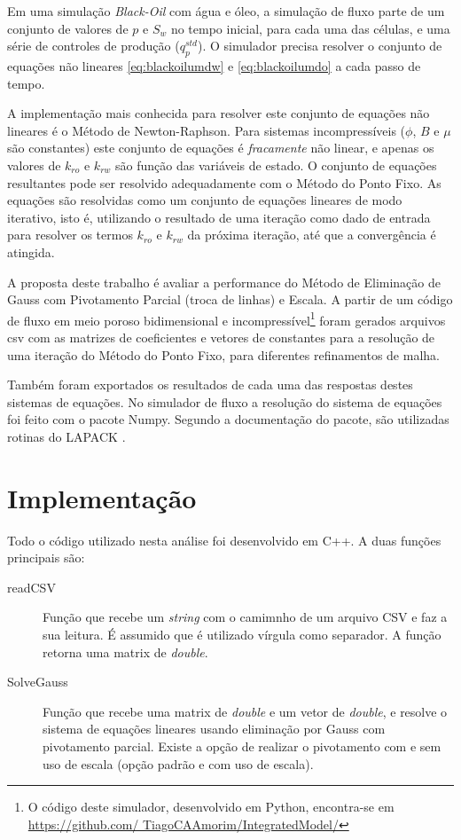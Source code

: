 \documentclass[final,5p]{elsarticle}
\numberwithin{equation}{section}
\begin{document}
            Em uma simulação \emph{Black-Oil} com água e óleo, a simulação de fluxo parte de um conjunto de valores de $p$ e $S_w$ no tempo inicial, para cada uma das células, e uma série de controles de produção ($q^{std}_p$). O simulador precisa resolver o conjunto de equações não lineares \ref{eq:blackoilumdw} e \ref{eq:blackoilumdo} a cada passo de tempo.

            A implementação mais conhecida para resolver este conjunto de equações não lineares é o Método de Newton-Raphson. Para sistemas incompressíveis ($\phi$, $B$ e $\mu$ são constantes) este conjunto de equações é \emph{fracamente} não linear, e apenas os valores de $k_{ro}$ e $k_{rw}$ são função das variáveis de estado. O conjunto de equações resultantes pode ser resolvido adequadamente com o Método do Ponto Fixo. As equações são resolvidas como um conjunto de equações lineares de modo iterativo, isto é, utilizando o resultado de uma iteração como dado de entrada para resolver os termos $k_{ro}$ e $k_{rw}$ da próxima iteração, até que a convergência é atingida.

            A proposta deste trabalho é avaliar a performance do Método de Eliminação de Gauss com Pivotamento Parcial (troca de linhas) e Escala. A partir de um código de fluxo em meio poroso bidimensional e incompressível\footnote{O código deste simulador, desenvolvido em Python, encontra-se em \href{https://github.com/TiagoCAAmorim/IntegratedModel/tree/test_matrix}{https://github.com/ TiagoCAAmorim/IntegratedModel/}} foram gerados arquivos csv com as matrizes de coeficientes e vetores de constantes para a resolução de uma iteração do Método do Ponto Fixo, para diferentes refinamentos de malha.

            Também foram exportados os resultados de cada uma das respostas destes sistemas de equações. No simulador de fluxo a resolução do sistema de equações foi feito com o pacote Numpy. Segundo a documentação do pacote, são utilizadas rotinas do LAPACK \cite{dongarra1992lapack}.

\section{Implementação} \label{sec:implementacao}

        Todo o código utilizado nesta análise foi desenvolvido em C++. A duas funções principais são:

        \begin{description}
            \item[readCSV] Função que recebe um \emph{string} com o camimnho de um arquivo CSV e faz a sua leitura. É assumido que é utilizado vírgula como separador. A função retorna uma matrix de \emph{double}.
            \item[SolveGauss] Função que recebe uma matrix de \emph{double} e um vetor de \emph{double}, e resolve o sistema de equações lineares usando eliminação por Gauss com pivotamento parcial. Existe a opção de realizar o pivotamento com e sem uso de escala (opção padrão e com uso de escala).
        \end{description}
\end{document}
